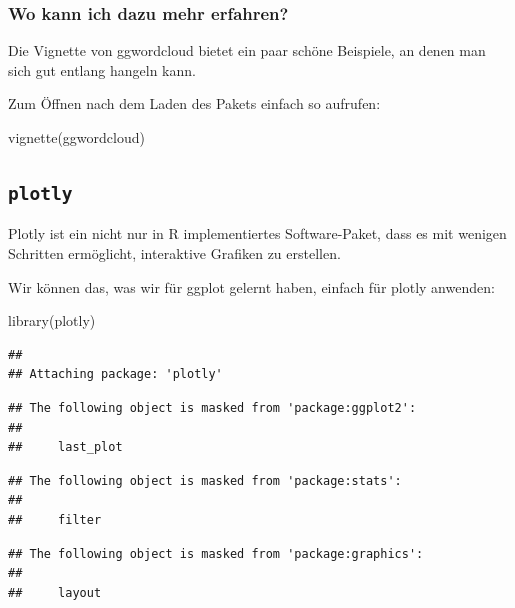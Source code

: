\documentclass[
]{book}
\newenvironment{Shaded}{\begin{snugshade}}{\end{snugshade}}
\newcommand{\FunctionTok}[1]{\textcolor[rgb]{0.00,0.00,0.00}{#1}}
\newcommand{\NormalTok}[1]{#1}
\newcommand{\StringTok}[1]{\textcolor[rgb]{0.31,0.60,0.02}{#1}}
\begin{document}
\hypertarget{wo-kann-ich-dazu-mehr-erfahren-2}{%
\subsubsection{Wo kann ich dazu mehr erfahren?}\label{wo-kann-ich-dazu-mehr-erfahren-2}}

Die Vignette von ggwordcloud bietet ein paar schöne Beispiele, an denen man sich gut entlang hangeln kann.

Zum Öffnen nach dem Laden des Pakets einfach so aufrufen:

\begin{Shaded}
\begin{Highlighting}[]
\FunctionTok{vignette}\NormalTok{(}\StringTok{\textquotesingle{}ggwordcloud\textquotesingle{}}\NormalTok{)}
\end{Highlighting}
\end{Shaded}

\hypertarget{plotly}{%
\subsection{\texorpdfstring{\texttt{plotly}}{plotly}}\label{plotly}}

Plotly ist ein nicht nur in R implementiertes Software-Paket, dass es mit wenigen Schritten ermöglicht, interaktive Grafiken zu erstellen.

Wir können das, was wir für ggplot gelernt haben, einfach für plotly anwenden:

\begin{Shaded}
\begin{Highlighting}[]
\FunctionTok{library}\NormalTok{(plotly)}
\end{Highlighting}
\end{Shaded}

\begin{verbatim}
## 
## Attaching package: 'plotly'
\end{verbatim}

\begin{verbatim}
## The following object is masked from 'package:ggplot2':
## 
##     last_plot
\end{verbatim}

\begin{verbatim}
## The following object is masked from 'package:stats':
## 
##     filter
\end{verbatim}

\begin{verbatim}
## The following object is masked from 'package:graphics':
## 
##     layout
\end{verbatim}
\end{document}
